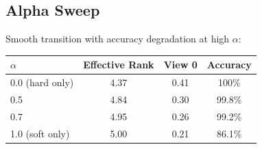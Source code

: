 \documentclass{article}
\begin{document}
\subsection{Alpha Sweep}
Smooth transition with accuracy degradation at high $\alpha$:

\begin{table}[h]
\centering
\begin{tabular}{@{}lccc@{}}
\toprule
$\alpha$ & Effective Rank & View 0 & Accuracy \\
\midrule
0.0 (hard only) & 4.37 & 0.41 & 100\% \\
0.5 & 4.84 & 0.30 & 99.8\% \\
0.7 & 4.95 & 0.26 & 99.2\% \\
1.0 (soft only) & 5.00 & 0.21 & 86.1\% \\
\bottomrule
\end{tabular}
\end{table}
\end{document}

